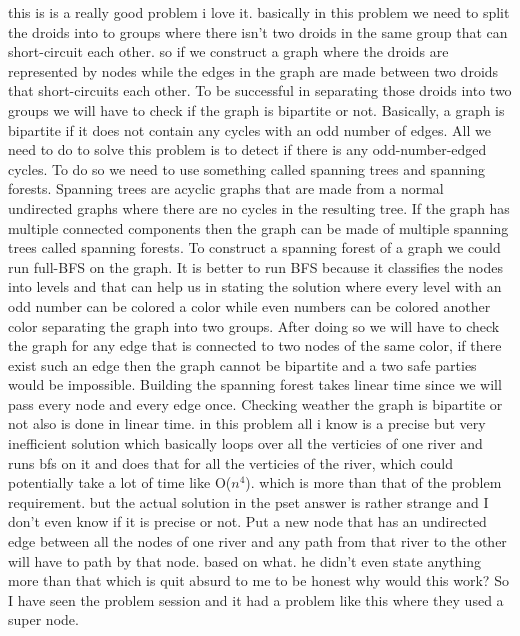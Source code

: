 \documentclass[12pt,twoside]{article}
\begin{document}
\begin{problems}
\newpage
\problem  %
this is is a really good problem i love it. basically in this problem we need to split the droids into to groups where there isn't two droids in the same group that can short-circuit each other. so if we construct a graph where the droids are represented by nodes while the edges in the graph are made between two droids that short-circuits each other. To be successful in separating those droids into two groups we will have to check if the graph is bipartite or not. Basically, a graph is bipartite if it does not contain any cycles with an odd number of edges. All we need to do to solve this problem is to detect if there is any odd-number-edged cycles. To do so we need to use something called spanning trees and spanning forests. Spanning trees are acyclic graphs that are made from a normal undirected graphs where there are no cycles in the resulting tree. If the graph has multiple connected components then the graph can be made of multiple spanning trees called spanning forests.
To construct a spanning forest of a graph we could run full-BFS on the graph. It is better to run BFS because it classifies the nodes into levels and that can help us in stating the solution where every level with an odd number can be colored a color while even numbers can be colored another color separating the graph into two groups. After doing so we will have to check the graph for any edge that is connected to two nodes of the same color, if there exist such an edge then the graph cannot be bipartite and a two safe parties would be impossible. Building the spanning forest takes linear time since we will pass every node and every edge once. Checking weather the graph is bipartite or not also is done in linear time.
\newpage
\problem  %
in this problem all i know is a precise but very inefficient solution which basically loops over all the verticies of one river and runs bfs on it and does that for all the verticies of the river, which could potentially take a lot of time like O($n^4$). which is more than that of the problem requirement. but the actual solution in the pset answer is rather strange and I don't even know if it is precise or not. Put a new node that has an undirected edge between all the nodes of one river and any path from that river to the other will have to path by that node. based on what. he didn't even state anything more than that which is quit absurd to me to be honest why would this work?
So I have seen the problem session and it had a problem like this where they used a super node. 


\end{problems}
\end{document}
